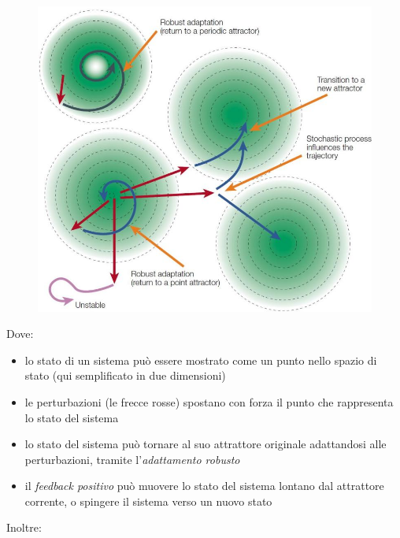 \documentclass[a4paper,12pt, oneside]{book}
\begin{document}
\begin{figure}[H]
  \centering
  \includegraphics[scale = 0.4]{img/rob.jpg}
\end{figure}
Dove:
\begin{itemize}
  \item lo stato di un sistema può essere mostrato come un punto nello spazio di
  stato (qui semplificato in due dimensioni) 
  \item le perturbazioni (le frecce rosse) spostano con forza il punto che
  rappresenta lo stato del sistema 
  \item lo stato del sistema può tornare al suo attrattore originale adattandosi
  alle perturbazioni, tramite l'\textit{adattamento robusto}
  \item il \textit{feedback positivo} può muovere lo stato del sistema lontano
  dal 
  attrattore corrente, o spingere il sistema verso un nuovo stato 
\end{itemize}
Inoltre:
\end{document}
